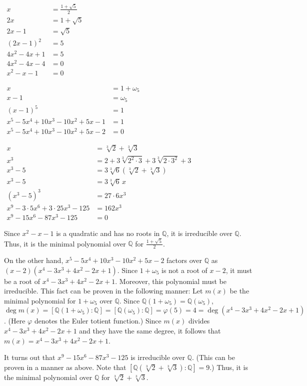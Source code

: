 \documentclass[12pt]{article}
\begin{document}
\begin{center}
$\begin{array}{rl}
x & =\displaystyle \frac{1+\sqrt{5}}{2} \\
2x & =1+\sqrt{5} \\
2x-1 & =\sqrt{5} \\
(2x-1)^2 & =5 \\
4x^2-4x+1 & =5 \\
4x^2-4x-4 & =0 \\
x^2-x-1 & =0 \end{array}$

$\begin{array}{rl}
x & =1+\omega_5 \\
x-1 & =\omega_5 \\
(x-1)^5 & =1 \\
x^5-5x^4+10x^3-10x^2+5x-1 & =1 \\
x^5-5x^4+10x^3-10x^2+5x-2 & =0 \end{array}$

$\begin{array}{rl}
x & =\sqrt[3]{2}+\sqrt[3]{3} \\
x^3 & =2+3\sqrt[3]{2^2 \cdot 3}+3\sqrt[3]{2 \cdot 3^2}+3 \\
x^3-5 & =3\sqrt[3]{6}(\sqrt[3]{2}+\sqrt[3]{3}) \\
x^3-5 & =3\sqrt[3]{6} \, x \\
(x^3-5)^3 & =27 \cdot 6x^3 \\
x^9-3 \cdot 5x^6+3 \cdot 25x^3-125 & =162x^3 \\
x^9-15x^6-87x^3-125 & =0 \end{array}$
\end{center}

Since $x^2-x-1$ is a quadratic and has no roots in $\mathbb{Q}$, it is irreducible over $\mathbb{Q}$.  Thus, it is the minimal polynomial over $\mathbb{Q}$ for $\displaystyle \frac{1+\sqrt{5}}{2}$.

On the other hand, $x^5-5x^4+10x^3-10x^2+5x-2$ factors over $\mathbb{Q}$ as $(x-2)(x^4-3x^3+4x^2-2x+1)$.  Since $1+\omega_5$ is not a root of $x-2$, it must be a root of $x^4-3x^3+4x^2-2x+1$.  Moreover, this polynomial must be irreducible.  This fact can be proven in the following manner:  Let $m(x)$ be the minimal polynomial for $1+\omega_5$ over $\mathbb{Q}$.  Since $\mathbb{Q}(1+\omega_5)=\mathbb{Q}(\omega_5)$, $\deg m(x)=[\mathbb{Q}(1+\omega_5)\!:\!\mathbb{Q}]=[\mathbb{Q}(\omega_5)\!:\!\mathbb{Q}]=\varphi(5)=4=\deg (x^4-3x^3+4x^2-2x+1)$.  (Here $\varphi$ denotes the Euler totient function.)  Since $m(x)$ divides $x^4-3x^3+4x^2-2x+1$ and they have the same degree, it follows that $m(x)=x^4-3x^3+4x^2-2x+1$.

It turns out that $x^9-15x^6-87x^3-125$ is irreducible over $\mathbb{Q}$.  (This can be proven in a  manner as above.  Note that $[\mathbb{Q}(\sqrt[3]{2}+\sqrt[3]{3})\!:\!\mathbb{Q}]=9$.)  Thus, it is the minimal polynomial over $\mathbb{Q}$ for $\sqrt[3]{2}+\sqrt[3]{3}$.
\end{document}
